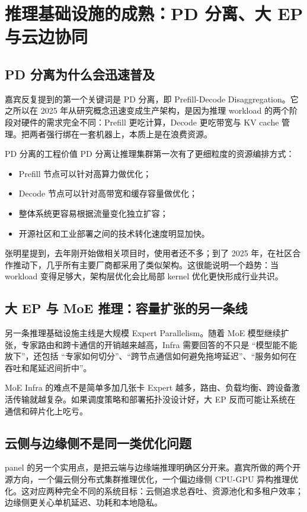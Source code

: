 \section{推理基础设施的成熟：PD 分离、大 EP 与云边协同}

\subsection{PD 分离为什么会迅速普及}
嘉宾反复提到的第一个关键词是 PD 分离，即 Prefill-Decode Disaggregation。它之所以在 2025 年从研究概念迅速变成生产架构，是因为推理 workload 的两个阶段对硬件的需求完全不同：Prefill 更吃计算，Decode 更吃带宽与 KV cache 管理。把两者强行绑在一套机器上，本质上是在浪费资源。

\begin{importantbox}{PD 分离的工程价值}
PD 分离让推理集群第一次有了更细粒度的资源编排方式：
\begin{itemize}
  \item Prefill 节点可以针对高算力做优化；
  \item Decode 节点可以针对高带宽和缓存容量做优化；
  \item 整体系统更容易根据流量变化独立扩容；
  \item 开源社区和工业部署之间的技术转化速度明显加快。
\end{itemize}
\end{importantbox}

张明星提到，去年刚开始做相关项目时，使用者还不多；到了 2025 年，在社区合作推动下，几乎所有主要厂商都采用了类似架构。这很能说明一个趋势：当 workload 变得足够大，架构层优化会比局部 kernel 优化更快形成行业共识。

\subsection{大 EP 与 MoE 推理：容量扩张的另一条线}
另一条推理基础设施主线是大规模 Expert Parallelism。随着 MoE 模型继续扩张，专家路由和跨卡通信的开销越来越高，Infra 需要回答的不只是 ``模型能不能放下''，还包括 ``专家如何切分''、``跨节点通信如何避免拖垮延迟''、``服务如何在吞吐和尾延迟间折中''。

\begin{warningbox}{MoE Infra 的难点不是简单多加几张卡}
Expert 越多，路由、负载均衡、跨设备激活传输就越复杂。如果调度策略和部署拓扑没设计好，大 EP 反而可能让系统在通信和碎片化上吃亏。
\end{warningbox}

\subsection{云侧与边缘侧不是同一类优化问题}
panel 的另一个实用点，是把云端与边缘端推理明确区分开来。嘉宾所做的两个开源方向，一个偏云侧分布式集群推理优化，一个偏边缘侧 CPU-GPU 异构推理优化。这对应两种完全不同的系统目标：云侧追求总吞吐、资源池化和多租户效率；边缘侧更关心单机延迟、功耗和本地隐私。

